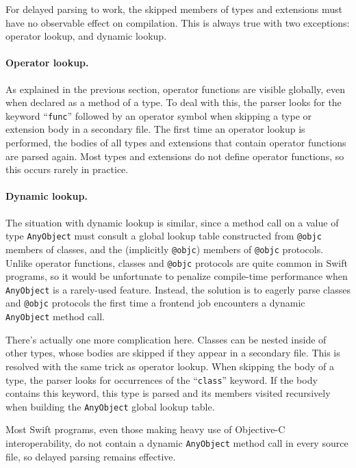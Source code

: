 \documentclass[../generics]{subfiles}
\begin{document}
For delayed parsing to work, the skipped members of types and extensions must have no observable effect on compilation. This is always true with two exceptions: operator lookup, and dynamic lookup.

\paragraph{Operator lookup.}
As explained in the previous section, operator functions are visible globally, even when declared as a method of a type. To deal with this, the parser looks for the keyword ``\texttt{func}'' followed by an operator symbol when skipping a type or extension body in a secondary file. The first time an operator lookup is performed, the bodies of all types and extensions that contain operator functions are parsed again. Most types and extensions do not define operator functions, so this occurs rarely in practice.

\paragraph{Dynamic  lookup.}
The situation with dynamic lookup is similar, since a method call on a value of type \texttt{AnyObject} must consult a global lookup table constructed from \texttt{@objc} members of classes, and the (implicitly \texttt{@objc}) members of \texttt{@objc} protocols.  Unlike operator functions, classes and \texttt{@objc} protocols are quite common in Swift programs, so it would be unfortunate to penalize compile-time performance when \texttt{AnyObject} is a rarely-used feature. Instead, the solution is to eagerly parse classes and \texttt{@objc} protocols the first time a frontend job encounters a dynamic \texttt{AnyObject} method call.

There's actually one more complication here. Classes can be nested inside of other types, whose bodies are skipped if they appear in a secondary file. This is resolved with the same trick as operator lookup. When skipping the body of a type, the parser looks for occurrences of the ``\texttt{class}'' keyword. If the body contains this keyword, this type is parsed and its members visited recursively when building the \texttt{AnyObject} global lookup table.

Most Swift programs, even those making heavy use of Objective-C interoperability, do not contain a dynamic \texttt{AnyObject} method call in every source file, so delayed parsing remains effective.
\end{document}
